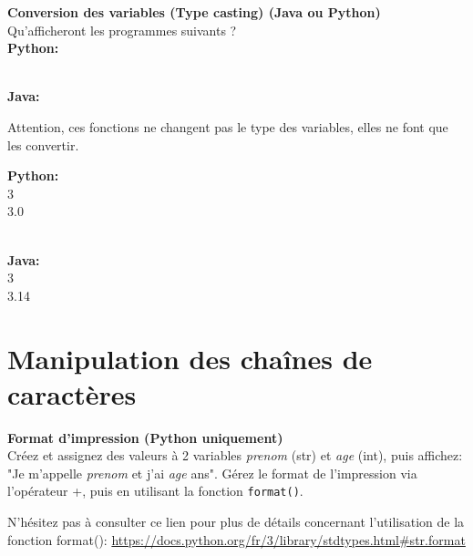 \begin{Exercice}[10 minutes] \textbf{Conversion des variables (Type casting) (Java ou Python)}\\
    Qu'afficheront les programmes suivants ? \\
    
    \textbf{Python:}
    
    
    \textbf{\\Java:}
    
     
    
     \begin{conseil}
           Attention, ces fonctions ne changent pas le type des variables, elles ne font que les convertir.
         
     \end{conseil}
     \begin{solution}
      
     \textbf{Python:}\\
     3\\
     3.0
     
     \textbf{\\Java:}\\
     3\\
     3.14 \\
            
     \end{solution}   
 \end{Exercice}


\newpage

\section{Manipulation des chaînes de caractères}

\begin{Exercice}[5 minutes] \textbf{Format d'impression (Python uniquement)}\\
    Créez et assignez des valeurs à 2 variables \textit{prenom} (str) et \textit{age} (int), puis affichez: "Je m'appelle \textit{prenom} et j'ai \textit{age} ans". Gérez le format de l'impression via l'opérateur +, puis en utilisant la fonction \lstinline{format()}. \\
    
     \begin{conseil}
        N'hésitez pas à consulter ce lien pour plus de détails concernant l'utilisation de la fonction format(): \url{https://docs.python.org/fr/3/library/stdtypes.html\#str.format}
     \end{conseil}
     \begin{solution}
      
     
            
     \end{solution}   
 \end{Exercice}

